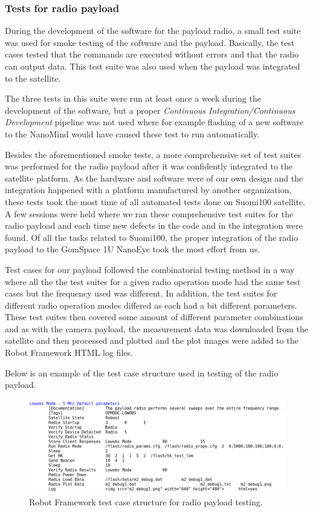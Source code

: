\documentclass[english,12pt,a4paper,pdftex,elec,utf8]{aaltothesis}
\begin{document}
\subsubsection{Tests for radio payload}
During the development of the software for the payload radio, a small test suite was used for smoke testing of the software and the payload. Basically, the test cases tested that the commands are executed without errors and that the radio can output data. This test suite was also used when the payload was integrated to the satellite.\par
The three tests in this suite were run at least once a week during the development of the software, but a proper \textit{Continuous Integration/Continuous Development} pipeline was not used where for example flashing of a new software to the NanoMind would have caused these test to run automatically.\par
Besides the aforementioned smoke tests, a more comprehensive set of test suites was performed for the radio payload after it was confidently integrated to the satellite platform. As the hardware and software were of our own design and the integration happened with a platform manufactured by another organization, these tests took the most time of all automated tests done on Suomi100 satellite. A few sessions were held where we ran these comprehensive test suites for the radio payload and each time new defects in the code and in the integration were found. Of all the tasks related to Suomi100, the proper integration of the radio payload to the GomSpace 1U NanoEye took the most effort from us.\par
Test cases for our payload followed the combinatorial testing method in a way where all the the test suites for a given radio operation mode had the same test cases but the frequency used was different. In addition, the test suites for different radio operation modes differed as each had a bit different parameters. These test suites then covered some amount of different parameter combinations and as with the camera payload, the measurement data was downloaded from the satellite and then processed and plotted and the plot images were added to the Robot Framework HTML log files.\par 
Below is an example of the test case structure used in testing of the radio payload.\par 
\begin{figure}[h!]
\includegraphics[scale=0.5]{payloadrfwtest}
\caption{Robot Framework test case structure for radio payload testing.}
\end{figure}
\end{document}

